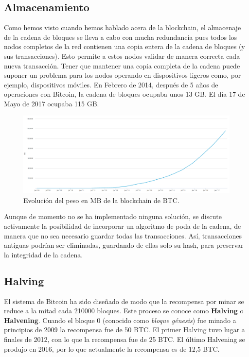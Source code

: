 \documentclass[twoside]{article}
\theoremstyle{definition}
\begin{document}
\subsection{Almacenamiento}
Como hemos visto cuando hemos hablado acera de la blockchain, el almacenaje de la cadena de bloques se lleva a cabo con mucha redundancia pues todos los nodos completos de la red contienen una copia entera de la cadena de bloques (y sus transacciones). Esto permite a estos nodos validar de manera
correcta cada nueva transacción. Tener que mantener una copia completa de la cadena puede suponer un problema para los nodos operando en dispositivos
ligeros como, por ejemplo, dispositivos móviles. En Febrero de 2014, después de 5 años de operaciones con Bitcoin, la cadena de bloques ocupaba unos 13 GB. El día 17 de Mayo de 2017 ocupaba 115 GB.
\begin{figure}[h]
\includegraphics[scale=0.45]{captura}
\captionsetup{labelformat=empty}
 \caption{Evolución del peso en MB de la blockchain de BTC.}
\end{figure}
Aunque de momento no se ha implementado ninguna solución, se discute activamente la posibilidad de incorporar un algoritmo de poda de la cadena, de manera que no sea necesario guardar todas las transacciones. Así, transacciones antiguas podrían ser eliminadas, guardando de ellas solo su hash, para preservar la integridad de la cadena.
\newpage
\subsection{Halving}
El sistema de Bitcoin ha sido diseñado de modo que la recompensa por minar se reduce a la mitad cada 210000 bloques. Este proceso se conoce como \textbf{Halving} o \textbf{Halvening}. Cuando el bloque 0 (conocido como \emph{bloque génesis}) fue minado a principios de 2009 la recompensa fue de 50 BTC. El primer Halving tuvo lugar a finales de 2012, con lo que la recompensa fue de 25 BTC. El último Halvening se produjo en 2016, por lo que actualmente la recompensa es de 12,5 BTC. 
\end{document}
